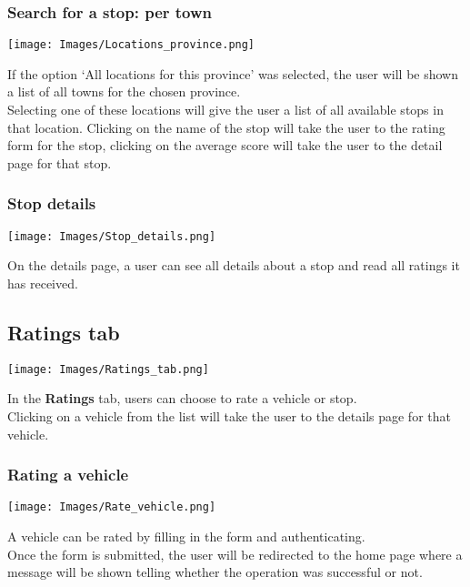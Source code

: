 \documentclass[12pt]{article}
\begin{document}
\subsubsection{Search for a stop: per town}
\begin{center}
	\texttt{[image: Images/Locations\_province.png]}
\end{center}
If the option `All locations for this province' was selected, the user will be shown a list of all towns for the chosen province.\\
Selecting one of these locations will give the user a list of all available stops in that location. Clicking on the name of the stop will take the user to the rating form for the stop, clicking on the average score will take the user to the detail page for that stop.\\

\subsubsection{Stop details}
\begin{center}
	\texttt{[image: Images/Stop\_details.png]}
\end{center}
On the details page, a user can see all details about a stop and read all ratings it has received.

\subsection{Ratings tab}
\begin{center}
	\texttt{[image: Images/Ratings\_tab.png]}
\end{center}
In the \textbf{Ratings} tab, users can choose to rate a vehicle or stop.\\
Clicking on a vehicle from the list will take the user to the details page for that vehicle.

\subsubsection{Rating a vehicle}
\begin{center}
	\texttt{[image: Images/Rate\_vehicle.png]}
\end{center}
A vehicle can be rated by filling in the form and authenticating. \\
Once the form is submitted, the user will be redirected to the home page where a message will be shown telling whether the operation was successful or not.
\end{document}
